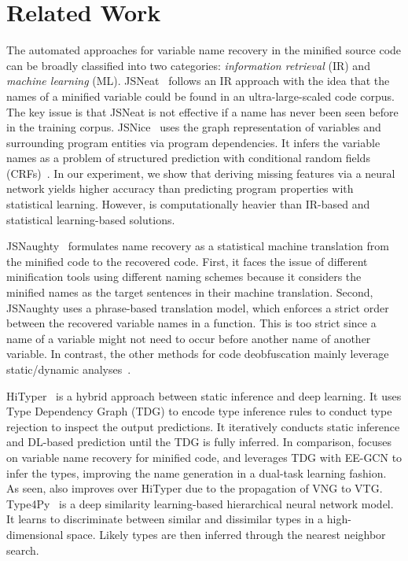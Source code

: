 \section{Related Work}
\label{related_section}

The automated approaches for variable name recovery in the minified
source code can be broadly classified into two categories: {\em
  information retrieval} (IR) and {\em machine learning} (ML).
JSNeat~\cite{icse19} follows an IR approach with the idea that the
names of a minified variable could be found in an ultra-large-scaled
code corpus. The key issue is that JSNeat is not effective if a name
has never been seen before in the training
corpus. JSNice~\cite{JSNice2015} uses the graph representation of
variables and surrounding program entities via program
dependencies. It infers the variable names as a problem of structured
prediction with conditional random fields (CRFs)~\cite{JSNice2015}.
In our experiment, we show that deriving missing features via a neural
network yields higher accuracy than predicting program properties with
statistical learning. However, {\tool} is computationally heavier than
IR-based and statistical learning-based solutions.

JSNaughty~\cite{JSNaughty2017} formulates name recovery as a
statistical machine translation from the minified code to the
recovered code. First, it faces the issue of different minification
tools using different naming schemes because it considers the minified
names as the target sentences in their machine translation.  Second,
JSNaughty uses a phrase-based translation model, which enforces a
strict order between the recovered variable names in a function. This
is too strict since a name of a variable might not need to occur
before another name of another variable.  In contrast, the other
methods for code deobfuscation mainly leverage static/dynamic
analyses~\cite{Christodorescu:2003:SAE:1251353.1251365,Moser:2007:EME:1263552.1264210,Udupa05deobfuscation:reverse}.


HiTyper~\cite{HiTyper-icse22} is a hybrid approach between static
inference and deep learning. It uses Type Dependency Graph (TDG) to
encode type inference rules to conduct type rejection to inspect the
output predictions. It iteratively conducts static inference and
DL-based prediction until the TDG is fully inferred. In comparison,
{\tool} focuses on variable name recovery for minified code, and
leverages TDG with EE-GCN to infer the types, improving the name
generation in a dual-task learning fashion. As seen, {\tool} also
improves over HiTyper due to the propagation of VNG to VTG.
%
Type4Py~\cite{Type4Py-icse22} is a deep similarity learning-based
hierarchical neural network model. It learns to discriminate between
similar and dissimilar types in a high-dimensional space. Likely types
are then inferred through the nearest neighbor search.

